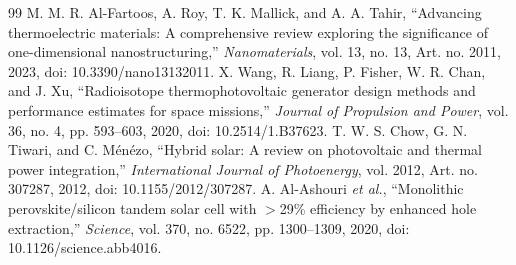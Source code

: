 \documentclass[conference]{../../../../Conference-LaTeX-template_10-17-19/IEEEtran}
\begin{document}
\begin{thebibliography}{99}
 M. M. R. Al-Fartoos, A. Roy, T. K. Mallick, and A. A. Tahir, ``Advancing thermoelectric materials: A comprehensive review exploring the significance of one-dimensional nanostructuring,'' \emph{Nanomaterials}, vol. 13, no. 13, Art. no. 2011, 2023, doi: 10.3390/nano13132011.
 X. Wang, R. Liang, P. Fisher, W. R. Chan, and J. Xu, ``Radioisotope thermophotovoltaic generator design methods and performance estimates for space missions,'' \emph{Journal of Propulsion and Power}, vol. 36, no. 4, pp. 593--603, 2020, doi: 10.2514/1.B37623.
 T. W. S. Chow, G. N. Tiwari, and C. M\'en\'ezo, ``Hybrid solar: A review on photovoltaic and thermal power integration,'' \emph{International Journal of Photoenergy}, vol. 2012, Art. no. 307287, 2012, doi: 10.1155/2012/307287.
 A. Al-Ashouri \emph{et al.}, ``Monolithic perovskite/silicon tandem solar cell with $>$29\% efficiency by enhanced hole extraction,'' \emph{Science}, vol. 370, no. 6522, pp. 1300--1309, 2020, doi: 10.1126/science.abb4016.
\end{thebibliography}
\end{document}
